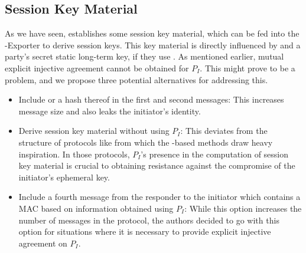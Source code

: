 \documentclass[runningheads]{llncs}
\begin{document}
\subsection{Session Key Material}
\label{sec:sessionKeyMaterial}
As we have seen, \mEdhoc{} establishes some session key material, which can be fed into the \mEdhoc{}-Exporter to derive session keys.
%
This key material is directly influenced by \mGxy{} and a party's secret static long-term key, if they use \mStat{}.
%
As mentioned earlier, mutual explicit injective agreement cannot be obtained for $P_{I}$.
%
This might prove to be a problem, and we propose three potential alternatives for addressing this.
%
\begin{itemize}
\item Include \mIdcredi{} or a hash thereof in the first and second messages: 
%
This increases message size and also leaks the initiator's identity.
\item Derive session key material without using $P_{I}$: 
%
This deviates from the structure of protocols like \mOptls{} from which the \mStat{}-based methods draw heavy inspiration.
%
In those protocols, $P_{I}$'s presence in the computation of session key material is crucial to obtaining resistance against the compromise of the initiator's ephemeral key.
\item Include a fourth message from the responder to the initiator which contains a MAC based on information obtained using $P_{I}$:
%
While this option increases the number of messages in the protocol, the authors decided to go with this option for situations where it is necessary to provide explicit injective agreement on $P_{I}$.
\end{itemize}

\end{document}
